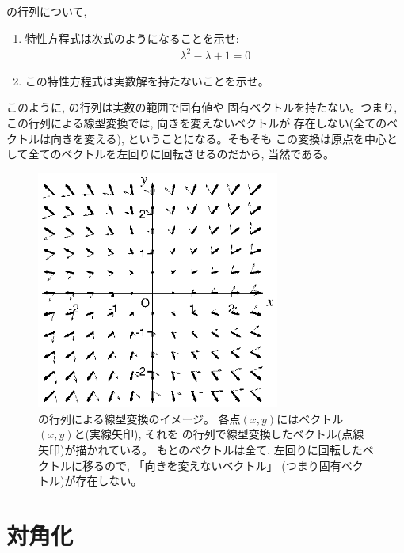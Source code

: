 \begin{q}\label{q:matrix_eigen2D2} の行列について, 
\begin{enumerate}
\item 特性方程式は次式のようになることを示せ:
\begin{eqnarray}\lambda^2-\lambda+1=0\end{eqnarray}
\item この特性方程式は実数解を持たないことを示せ。
\end{enumerate}\end{q}
\mv


このように, の行列は実数の範囲で固有値や
固有ベクトルを持たない。つまり, この行列による線型変換では, 向きを変えないベクトルが
存在しない(全てのベクトルは向きを変える), ということになる。そもそも
この変換は原点を中心として全てのベクトルを左回りに回転させるのだから, 当然である。

\begin{figure}[ht]
    \centering
    \includegraphics[width=8cm]{rot_vectf.eps}
    \caption{の行列による線型変換のイメージ。
各点$(x, y)$にはベクトル$(x, y)$と(実線矢印), それを
の行列で線型変換したベクトル(点線矢印)が描かれている。
もとのベクトルは全て, 左回りに回転したベクトルに移るので, 「向きを変えないベクトル」
(つまり固有ベクトル)が存在しない。}
\end{figure}
\vv



\section{対角化}

